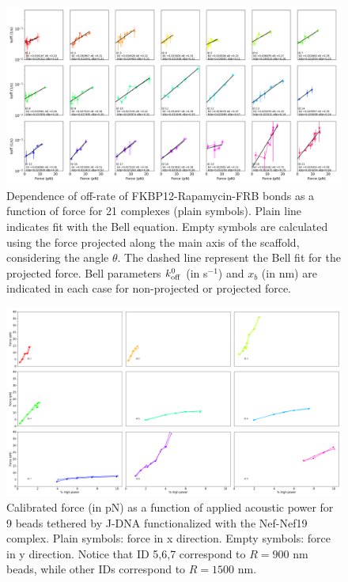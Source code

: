 \documentclass{biophys-new}
\begin{document}
\begin{figure}
	\centering
	\centerline {\includegraphics[width=1\linewidth]{Figures/offrate_vs_forceBis_Rapa.png}}
	\caption{Dependence of off-rate of FKBP12-Rapamycin-FRB bonds as a function of force for 21 complexes (plain symbols). Plain line indicates fit with the Bell equation. Empty symbols are calculated using the force projected along the main axis of the scaffold, considering the angle $\theta$. The dashed line represent the Bell fit for the projected force. Bell parameters $k^0_{\rm off}$ (in s$^{-1}$) and $x_b$ (in nm) are indicated in each case for non-projected or projected force. }
	\label{fig:offrate_force}	
\end{figure}

\begin{figure}[hbt!]
	\centering
	\centerline {\includegraphics[width=1\linewidth]{Figures/Power_vs_Force_Bis_Nef.png}}
	\caption{Calibrated force (in pN) as a function of applied acoustic power for 9 beads tethered by J-DNA  functionalized with the Nef-Nef19 complex.  Plain symbols: force in x direction. Empty symbols: force in y direction. Notice that ID 5,6,7 correspond to $R= 900$ nm beads, while other IDs correspond to $R=1500$ nm.}
	\label{fig:PowerForce_Nef}	
\end{figure}
\end{document}

